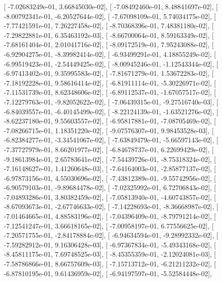 \documentclass{article}
\begin{document}
       [ -7.02683249e-01,   3.66845030e-02],
       [ -7.08492460e-01,   8.48841697e-02],
       [ -8.00792341e-01,  -6.20527644e-02],
       [ -7.67098109e-01,   5.74034175e-02],
       [ -7.77421591e-01,   7.26227458e-02],
       [ -8.70368396e-01,   7.48381180e-02],
       [ -7.29822881e-01,   6.35463192e-03],
       [ -8.66700064e-01,   8.59163349e-02],
       [ -7.68161404e-01,   2.01041716e-02],
       [ -8.09172519e-01,   7.95243088e-02],
       [ -6.92904275e-01,  -8.39982414e-02],
       [ -6.93499291e-01,   4.18855249e-02],
       [ -6.99519423e-01,  -2.54449425e-02],
       [ -8.00945246e-01,  -1.12543344e-02],
       [ -6.97413402e-01,   9.35995583e-02],
       [ -7.81671279e-01,   1.53672283e-02],
       [ -7.18192228e-01,   9.58616414e-02],
       [ -6.81911114e-01,  -5.30226971e-02],
       [ -7.11531739e-01,   8.62348606e-02],
       [ -6.89112537e-01,  -1.67057517e-02],
       [ -7.12279763e-01,  -9.82052622e-02],
       [ -7.06439315e-01,  -9.27516740e-03],
       [ -6.84039557e-01,  -6.40145499e-02],
       [ -8.22124139e-01,  -1.63521276e-02],
       [ -8.62237180e-01,   9.55603557e-02],
       [ -6.95817881e-01,  -7.08705469e-02],
       [ -7.08266715e-01,   1.18351220e-02],
       [ -9.07576307e-01,   9.98453528e-03],
       [ -6.82384277e-01,  -3.34541067e-02],
       [ -7.63849479e-01,  -5.66597143e-02],
       [ -7.37727979e-01,   8.66201977e-02],
       [ -6.84678737e-01,   6.22699429e-02],
       [ -9.18613984e-01,   2.65783641e-02],
       [ -7.54439726e-01,  -8.75318324e-02],
       [ -7.16148627e-01,   1.41260648e-03],
       [ -7.64164003e-01,  -2.85877137e-02],
       [ -6.97873156e-01,   4.55030696e-02],
       [ -7.43812389e-01,  -9.55742956e-02],
       [ -6.90579103e-01,  -9.89684478e-02],
       [ -7.02325992e-01,   6.72706843e-02],
       [ -7.04893286e-01,   3.80382459e-02],
       [ -7.05813940e-01,  -4.60743857e-02],
       [ -8.67093673e-01,  -2.67746633e-02],
       [ -7.14228693e-01,  -8.36668987e-02],
       [ -7.01464665e-01,   4.88583196e-02],
       [ -7.04396409e-01,  -8.79791214e-02],
       [ -7.12541247e-01,   3.66618165e-02],
       [ -7.00958197e-01,   6.77556625e-02],
       [ -7.20571755e-01,  -2.84178884e-02],
       [ -6.94634594e-01,  -9.28992332e-02],
       [ -7.59282912e-01,   9.16306428e-03],
       [ -6.97367834e-01,  -5.49343168e-02],
       [ -8.45811175e-01,   7.69748525e-03],
       [ -8.45355359e-01,  -2.12024081e-03],
       [ -7.58786866e-01,   8.66757609e-03],
       [ -7.15713712e-01,  -6.21211232e-02],
       [ -6.87810195e-01,   9.61436959e-02],
       [ -6.94197597e-01,  -5.52584448e-02],
\end{document}
